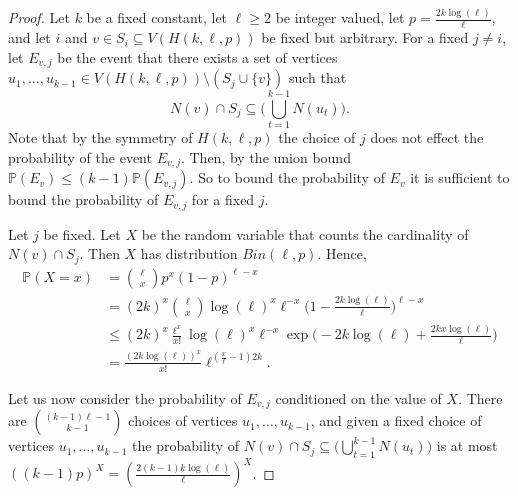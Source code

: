 \documentclass[12pt]{amsart}
\theoremstyle{definition}
\begin{document}
\begin{proof}
    Let $k$ be a fixed constant, let $\ell\geq 2$ be integer valued, let $p = \frac{2k\log(\ell)}{\ell}$,
    and 
    let $i$ and $v \in S_i \subseteq V(H(k,\ell,p))$ be fixed but arbitrary.
    For a fixed $j\neq i$, let $E_{v,j}$ be the event
    that there exists a set of vertices $u_1,\dots, u_{k-1} \in V(H(k,\ell,p))\setminus (S_j \cup \{v\})$
    such that 
    \[
    N(v) \cap S_j \subseteq \Big(\bigcup_{t=1}^{k-1} N(u_t) \Big).
    \]
    Note that by the symmetry of $H(k,\ell,p)$ the choice of $j$ does not effect the probability of the event $E_{v,j}$.
    Then, by the union bound $\mathbb{P}(E_v) \leq (k-1)\mathbb{P}(E_{v,j})$.
    So to bound the probability of $E_v$ it is sufficient to bound the probability of $E_{v,j}$ for a fixed $j$.

    Let $j$ be fixed.
    Let $X$ be the random variable that counts the cardinality of $N(v) \cap S_j$.
    Then $X$ has distribution $Bin(\ell,p)$.
    Hence,
    \begin{align*}
        \mathbb{P}(X = x) & = \binom{\ell}{x}p^x(1-p)^{\ell-x} \\
        & = (2k)^x\binom{\ell}{x}\log(\ell)^x \ell^{-x}\Big(1-\frac{2k\log(\ell)}{\ell} \Big)^{\ell-x} \\
        & \leq (2k)^x\frac{\ell^x}{x!}\log(\ell)^x \ell^{-x} \exp\Big(-2k\log(\ell) + \frac{2kx\log(\ell)}{\ell}\Big) \\
        & = \frac{(2k\log(\ell))^x}{x!}\ell^{(\frac{x}{\ell}-1)2k}.
    \end{align*}

    Let us now consider the probability of $E_{v,j}$ conditioned on the value of $X$.
    There are $\binom{(k-1)\ell-1}{k-1}$ choices of vertices $u_1,\dots, u_{k-1}$,
    and given a fixed choice of vertices $u_1,\dots, u_{k-1}$ 
    the probability of $N(v) \cap S_j \subseteq \Big(\bigcup_{t=1}^{k-1} N(u_t) \Big)$
    is at most $((k-1)p)^{X} = (\frac{2(k-1)k\log(\ell)}{\ell})^X$.


\end{proof}
\end{document}
